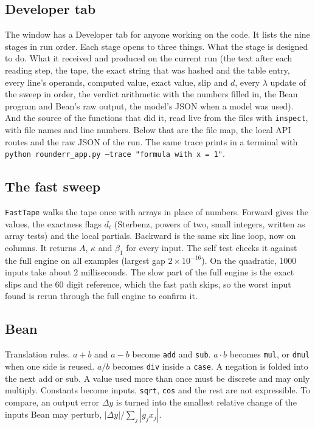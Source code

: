 \documentclass[11pt]{article}
\begin{document}
\subsection*{Developer tab}
The window has a Developer tab for anyone working on the code. It lists the nine stages in run order. Each stage opens to three things. What the stage is designed to do. What it received and produced on the current run (the text after each reading step, the tape, the exact string that was hashed and the table entry, every line's operands, computed value, exact value, slip and $d$, every $\lambda$ update of the sweep in order, the verdict arithmetic with the numbers filled in, the Bean program and Bean's raw output, the model's JSON when a model was used). And the source of the functions that did it, read live from the files with \texttt{inspect}, with file names and line numbers. Below that are the file map, the local API routes and the raw JSON of the run. The same trace prints in a terminal with \texttt{python rounderr\_app.py --trace "formula with x = 1"}.

\subsection*{The fast sweep}
\texttt{FastTape} walks the tape once with arrays in place of numbers. Forward gives the values, the exactness flags $d_i$ (Sterbenz, powers of two, small integers, written as array tests) and the local partials. Backward is the same six line loop, now on columns. It returns $A$, $\kappa$ and $\beta_1$ for every input. The self test checks it against the full engine on all examples (largest gap $2\times10^{-16}$). On the quadratic, 1000 inputs take about 2 milliseconds. The slow part of the full engine is the exact slips and the 60 digit reference, which the fast path skips, so the worst input found is rerun through the full engine to confirm it.

\subsection*{Bean}
Translation rules. $a+b$ and $a-b$ become \texttt{add} and \texttt{sub}. $a\cdot b$ becomes \texttt{mul}, or \texttt{dmul} when one side is reused. $a/b$ becomes \texttt{div} inside a \texttt{case}. A negation is folded into the next add or sub. A value used more than once must be discrete and may only multiply. Constants become inputs. \texttt{sqrt}, \texttt{cos} and the rest are not expressible. To compare, an output error $\Delta y$ is turned into the smallest relative change of the inputs Bean may perturb, $|\Delta y| / \sum_j |g_j x_j|$.
\end{document}
